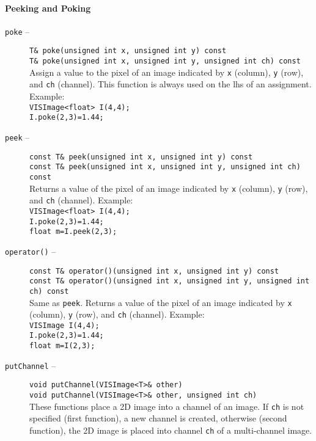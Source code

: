 \paragraph{Peeking and Poking}
\begin{description}
\item[{\tt poke} --]
{\tt T\& poke(unsigned int x, unsigned int y) const}\\
{\tt T\& poke(unsigned int x, unsigned int y, unsigned int ch) const}\\
Assign a value to the pixel of an image indicated by
{\tt x} (column), {\tt y} (row), and {\tt ch} (channel).
This function is always used on the lhs of an assignment.  Example:\\
{\tt VISImage<float> I(4,4);}\\
{\tt I.poke(2,3)=1.44;}
\item[{\tt peek} --]
{\tt const T\& peek(unsigned int x, unsigned int y) const}\\
{\tt const T\& peek(unsigned int x, unsigned int y, unsigned int ch) const}\\
Returns a value of the pixel of an image indicated by
{\tt x} (column), {\tt y} (row), and {\tt ch} (channel).  Example:\\
  {\tt VISImage<float> I(4,4);}\\
  {\tt I.poke(2,3)=1.44;}\\
  {\tt float m=I.peek(2,3);}
\item [{\tt operator()} --]
{\tt const T\& operator()(unsigned int x, unsigned int y) const}\\
{\tt const T\& operator()(unsigned int x, unsigned int y, unsigned int ch) const}\\
Same as {\tt peek}.
Returns a value of the pixel of an image indicated by
{\tt x} (column), {\tt y} (row), and {\tt ch} (channel).  Example:\\
  {\tt VISImage I(4,4);}\\
  {\tt I.poke(2,3)=1.44;}\\
  {\tt float m=I(2,3);}\\
\item[{\tt putChannel} --]
{\tt void putChannel(VISImage<T>\& other)}\\
{\tt void putChannel(VISImage<T>\& other, unsigned int ch)}\\
These functions place a 2D image into a channel of an image.
If {\tt ch} is not specified (first function), a new channel is created,
otherwise (second function), the 2D image is placed into channel {\tt ch}
of a multi-channel image.

\end{description}

